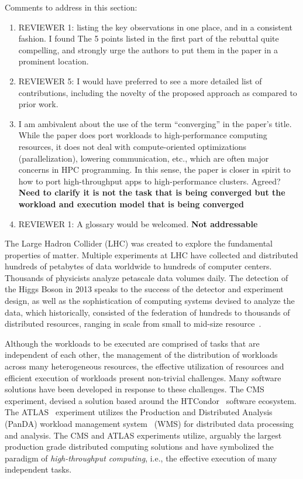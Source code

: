 \ifreview
Comments to address in this section:
\begin{enumerate}
	\item REVIEWER 1: listing the key observations in one place, and in a
	consistent fashion. I found The 5 points listed in the first part of the
	rebuttal quite compelling, and strongly urge the authors to put them in
	the paper in a prominent location.
	\item REVIEWER 5: I would have preferred to see a more detailed list of
	contributions, including the novelty of the proposed approach as compared
	to prior work.
	\item I am ambivalent about the use of the term ``converging'' in the
	paper's title. While the paper does port workloads to high-performance
	computing resources, it does not deal with compute-oriented optimizations
	(parallelization), lowering communication, etc., which are often major
	concerns in HPC programming. In this sense, the paper is closer in spirit
	to how to port high-throughput apps to high-performance clusters. Agreed?
	{\bf  Need to clarify it is not the task that is being converged but the workload and execution model that is being converged}
	\item REVIEWER 1: A glossary would be welcomed. {\bf Not addressable}
\end{enumerate}
\fi

The Large Hadron Collider (LHC) was created to explore the fundamental
properties of matter. Multiple experiments at LHC have collected and
distributed hundreds of petabytes of data worldwide to hundreds of computer
centers. Thousands of physicists analyze petascale data volumes daily. The
detection of the Higgs Boson in 2013 speaks to the success of the detector
and experiment design, as well as the sophistication of computing systems
devised to analyze the data, which historically, consisted of the federation
of hundreds to thousands of distributed resources, ranging in scale from
small to mid-size resource~\cite{foster2003grid}.

Although the workloads to be executed are comprised of tasks that are
independent of each other, the management of the distribution of workloads
across many heterogeneous resources, the effective utilization of resources
and efficient execution of workloads present non-trivial challenges. Many
software solutions have been developed in response to these challenges. The
CMS experiment, devised a solution based around the
HTCondor~\cite{thain2005distributed} software ecosystem. The
ATLAS~\cite{Aad:2008} experiment utilizes the Production and Distributed
Analysis (PanDA) workload management system~\cite{Maeno2011} (WMS) for
distributed data processing and analysis. The CMS and ATLAS experiments
utilize, arguably the largest production grade distributed computing
solutions and have symbolized the paradigm of {\it high-throughput
computing}, i.e., the effective execution of many independent tasks.

